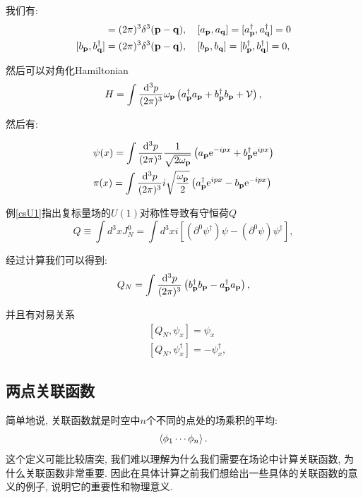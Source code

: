 我们有:
\begin{align}
    [\a p, \a q^\dagger]&=\dpi3\delta^3(\vec p-\vec q), \quad [\a p, \a q]=[\a p^\dagger, \a q^\dagger]=0\\
    [\b p, \b q^\dagger]&=\dpi3\delta^3(\vec p-\vec q), \quad [\b p, \b q]=[\b p^\dagger, \b q^\dagger]=0,
\end{align}

然后可以对角化Hamiltonian
\begin{equation}
    H=\int\frac{\mathrm d^3p}{(2\pi)^3}\omega_{\mathbf{p}}\left(a_{\mathbf{p}}^\dagger a_{\mathbf{p}}+b_{\mathbf{p}}^\dagger b_{\mathbf{p}}+\mathcal V\right),
\end{equation}


然后有:
\begin{important}
    \begin{align}
        &\psi(x)=\int\ldsq p\left(\a p\exp{-ipx}+\b p^\dagger\exp{ipx}\right)\\
        &\pi(x)=\int\ddd pi\sqrt{\frac{\om p}2}\left(\a p^\dagger\exp{ipx}-\b p\exp{-ipx}\right)
    \end{align}
\end{important}

例\ref{csU1}指出复标量场的$U(1)$对称性导致有守恒荷$Q$
\begin{equation}
    Q\equiv\int d^3x J_N^0=\int d^3xi\left[(\partial^0\psi^\dagger)\psi-(\partial^0\psi)\psi^\dagger\right],
\end{equation}

经过计算我们可以得到:
\begin{equation}
    Q_N=\int\frac{\mathrm d^3p}{(2\pi)^3}\left(b_{\mathbf{p}}^\dagger b_{\mathbf{p}}-a_{\mathbf{p}}^\dagger a_{\mathbf{p}}\right),
\end{equation}

并且有对易关系
\begin{align}\label{complex-scalar-Q-commutation-relations}
    &[Q_N, \psi_x]=\psi_x\\
    &[Q_N, \psi_x^\dagger]=-\psi_x^\dagger,
\end{align}


\subsection{两点关联函数}
简单地说, 关联函数就是时空中$n$个不同的点处的场乘积的平均:
$$
    \braket{\phi_1\cdots\phi_n}.
$$
这个定义可能比较唐突, 我们难以理解为什么我们需要在场论中计算关联函数, 为什么关联函数非常重要. 因此在具体计算之前我们想给出一些具体的关联函数的意义的例子, 说明它的重要性和物理意义.

